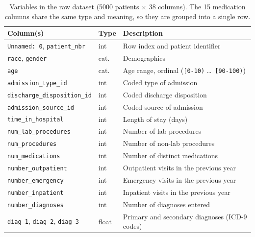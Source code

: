 \documentclass[11pt,a4paper]{article}
\begin{document}
\begin{table}[htbp]
\centering
\caption{Variables in the raw dataset (5000 patients $\times$ 38 columns). The 15
medication columns share the same type and meaning, so they are grouped into a single row.}
\label{tab:columns}
\scriptsize
\setlength{\tabcolsep}{6pt}
\renewcommand{\arraystretch}{1.05}
\begin{tabular}{@{}lll@{}}
\toprule
\textbf{Column(s)} & \textbf{Type} & \textbf{Description} \\
\midrule
\texttt{Unnamed: 0}, \texttt{patient\_nbr}           & int   & Row index and patient identifier \\
\texttt{race}, \texttt{gender}                       & cat.  & Demographics \\
\texttt{age}                                         & cat.  & Age range, ordinal (\texttt{[0-10)} \ldots\ \texttt{[90-100)}) \\
\texttt{admission\_type\_id}                          & int   & Coded type of admission \\
\texttt{discharge\_disposition\_id}                   & int   & Coded discharge disposition \\
\texttt{admission\_source\_id}                        & int   & Coded source of admission \\
\texttt{time\_in\_hospital}                           & int   & Length of stay (days) \\
\texttt{num\_lab\_procedures}                         & int   & Number of lab procedures \\
\texttt{num\_procedures}                              & int   & Number of non-lab procedures \\
\texttt{num\_medications}                             & int   & Number of distinct medications \\
\texttt{number\_outpatient}                           & int   & Outpatient visits in the previous year \\
\texttt{number\_emergency}                            & int   & Emergency visits in the previous year \\
\texttt{number\_inpatient}                            & int   & Inpatient visits in the previous year \\
\texttt{number\_diagnoses}                            & int   & Number of diagnoses entered \\
\texttt{diag\_1}, \texttt{diag\_2}, \texttt{diag\_3}  & float & Primary and secondary diagnoses (ICD-9 codes) \\

\end{tabular}
\end{table}
\end{document}
